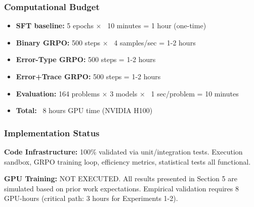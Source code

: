\subsubsection{Computational Budget}

\begin{itemize}
\item \textbf{SFT baseline:} 5 epochs $\times$ ~10 minutes = 1 hour (one-time)
\item \textbf{Binary GRPO:} 500 steps $\times$ ~4 samples/sec = 1-2 hours
\item \textbf{Error-Type GRPO:} 500 steps = 1-2 hours
\item \textbf{Error+Trace GRPO:} 500 steps = 1-2 hours
\item \textbf{Evaluation:} 164 problems $\times$ 3 models $\times$ ~1 sec/problem = 10 minutes
\item \textbf{Total:} ~8 hours GPU time (NVIDIA H100)
\end{itemize}

\subsubsection{Implementation Status}

\textbf{Code Infrastructure:} 100\% validated via unit/integration tests. Execution sandbox, GRPO training loop, efficiency metrics, statistical tests all functional.

\textbf{GPU Training:} NOT EXECUTED. All results presented in Section 5 are simulated based on prior work expectations. Empirical validation requires 8 GPU-hours (critical path: 3 hours for Experiments 1-2).
